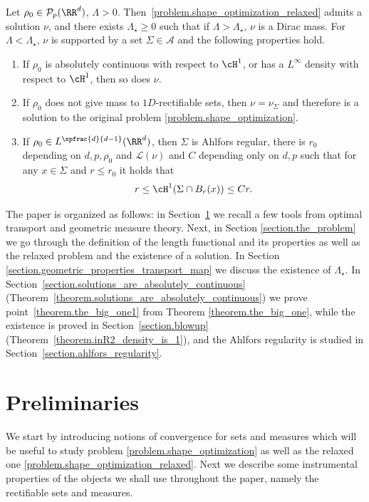 \begin{theorem}\label{theorem.the_big_one}
Let $\rho_0 \in \mathcal{P}_p(\RR^d)$, $\Lambda>0$. Then~\eqref{problem.shape_optimization_relaxed} admits a solution $\nu$, and there exists $\Lambda_\star \ge 0$ such that if $\Lambda>\Lambda_\star$, $\nu$ is a Dirac mass. For $\Lambda<\Lambda_\star$, $\nu$ is supported by a set $\Sigma \in \mathcal{A}$ and the following properties hold.
\begin{enumerate}
\item\label{theorem.the_big_one1}
If $\rho_0$ is absolutely continuous with respect to $\cH^1$, or has a $L^\infty$ density with respect to $\cH^1$, then so does $\nu$.
\item\label{theorem.the_big_one2}
If $\rho_0$ does not give mass to $1D$-rectifiable sets, then $\nu=\nu_\Sigma$ and therefore is a solution to the original problem \eqref{problem.shape_optimization}.
\item\label{theorem.the_big_one3}
If $\rho_0 \in L^{\spfrac{d}{d-1}}(\RR^d)$, then $\Sigma$ is Ahlfors regular, \ie there is $r_0$ depending on $d,p,\rho_0$ and $\mathcal{L}(\nu)$ and $C$ depending only on $d,p$ such that for any $x \in \Sigma$ and $r \le r_0$ it holds that
\[
r \le \cH^1(\Sigma \cap B_r(x))\le Cr.
\]
\end{enumerate}
\end{theorem}

The paper is organized as follows: in Section~\ref{section.preliminary_properties} we recall a few tools from optimal transport and geometric measure theory. Next, in Section \ref{section.the_problem} we go through the definition of the length functional and its properties as well as the relaxed problem and the existence of a solution. In Section \ref{section.geometric_properties_transport_map} we discuss
the existence of $\Lambda_\star$.
In Section~\ref{section.solutions_are_absolutely_continuous}
(Theorem~\ref{theorem.solutions_are_absolutely_continuous}) we prove point~\eqref{theorem.the_big_one1} from Theorem \ref{theorem.the_big_one}, while the existence is proved in Section~\ref{section.blowup} (Theorem~\ref{theorem.inR2_density_is_1}),
and the Ahlfors regularity is studied in Section~\ref{section.ahlfors_regularity}.

\section{Preliminaries}\label{section.preliminary_properties}
We start by introducing notions of convergence for sets and measures which will be useful to study problem \eqref{problem.shape_optimization} as well as the relaxed one \eqref{problem.shape_optimization_relaxed}. Next we describe some instrumental properties of the objects we shall use throughout the paper, namely the rectifiable sets and measures.

